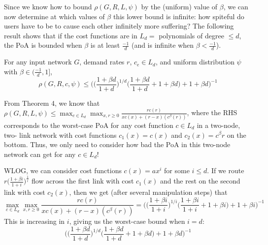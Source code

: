 Since we know how to bound $\rho(G,R,{L},\psi)$ by the (uniform) value of $\beta$, we can now determine at which values of $\beta$ this lower bound is infinite: how spiteful do users have to be to cause each other infinitely more suffering? The following result shows that if the cost functions are in $L_d =$ polynomials of degree $\le d$, the PoA is bounded when $\beta$ is at least $\frac{-1}{d}$ (and is infinite when $\beta < \frac{-1}d$).
\begin{theorem}
For any input network $G$, demand rates $r$, $c_e \in L_d$,
and uniform distribution $\psi$ with $\beta \in (\frac{-1}{d}, 1]$,
    $$\rho(G,R,c,\psi) \le \Big(\Big(\frac{1+\beta d}{1+d}\Big)^{1/d}\Big(\frac{1+\beta d}{1+d} + 1 + \beta d\Big)+ 1 + \beta d\Big)^{-1}$$
\end{theorem}
\begin{proof-sketch}
From Theorem 4, we know that 
$\rho(G,R,{L},\psi) \le \max_{c\in{L_d}} \max_{x,r\ge 0} \frac{rc(r)}{xc(x) + (r-x)(c^\beta(r))}$, where the RHS corresponds to the worst-case PoA for any cost function $c \in L_d$ in a two-node, two-
link network with cost functions $c_1(x) = c(x)$ and $c_2(x) = c^\beta{r}$ on the bottom. 
Thus, we only need to consider how bad the PoA in this two-node network can get for any $c\in L_d$!

WLOG, we can consider cost functions $c(x) = ax^i$ for some $i \le d$. 
If we route $r\Big(\frac{1+\beta i}{1+i}\Big)^{\frac{1}{i}}$ flow across the first link with cost $c_1(x)$ and the rest on the second link with cost $c_2(x)$, 
    then we get (after several manipulation steps) that 
$$\max_{c\in{L_d}} \max_{x,r\ge 0} \frac{rc(r)}{xc(x) + (r-x)(c^\beta(r))} = \Big(\Big(\frac{1+\beta i}{1+i}\Big)^{1/i}\Big(\frac{1+\beta i}{1+i} + 1 + \beta i\Big)+ 1 + \beta i\Big)^{-1}$$
    This is increasing in $i$, giving us the worst-case bound when $i=d$:
$$\Big(\Big(\frac{1+\beta d}{1+d}\Big)^{1/d}\Big(\frac{1+\beta d}{1+d} + 1 + \beta d\Big)+ 1 + \beta d\Big)^{-1}$$
\end{proof-sketch}

